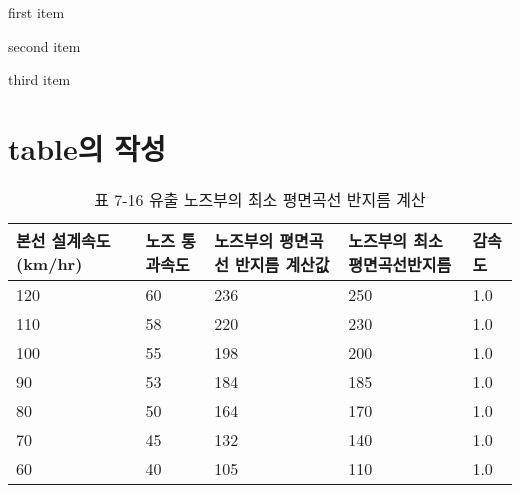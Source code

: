 \begin{list}{-}{body code}
\item first item
\item second item
\item third item
\end{list}





\newpage
\section{table의 작성}

		\begin{table}[htbp]
		\centering
		\caption{표 7-16 유출 노즈부의 최소 평면곡선 반지름 계산}
		\begin{tabular}{p{2cm}p{2cm}p{2cm}p{2cm}p{2cm}}
			\hline
			본선 설계속도 (km/hr) & 노즈
			통과속도 & 노즈부의 평면곡선 반지름 계산값 & 노즈부의 최소 평면곡선반지름 & 감속도 \\
			\hline
			120   & 60    & 236   & 250   & 1.0  \\
			110   & 58    & 220   & 230   & 1.0  \\
			100   & 55    & 198   & 200   & 1.0  \\
			90    & 53    & 184   & 185   & 1.0  \\
			80    & 50    & 164   & 170   & 1.0  \\
			70    & 45    & 132   & 140   & 1.0  \\
			60    & 40    & 105   & 110   & 1.0  \\
		\hline
		\end{tabular}%
		\label{tab:addlabel}%
		\end{table}%


